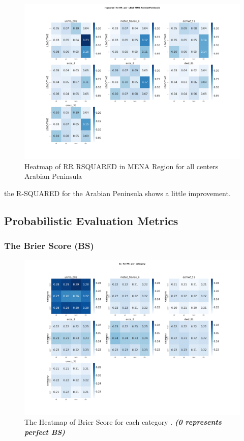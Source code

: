 \begin{figure}[H]
\includegraphics[scale=0.3]{plots/det/rsquared/rsquared_RR_ArabianPeninsula.png}
\caption{Heatmap of RR  RSQUARED in MENA Region for all centers Arabian Peninsula}
\end{figure}

the R-SQUARED for the Arabian Peninsula shows a little improvement.
\subsection{Probabilistic Evaluation Metrics}

\subsubsection{The Brier Score (BS)}

\begin{figure}[H]
    \centering
    \includegraphics[scale=0.25]{plots/prob/bs/bs_RR_category.png}
    \caption{The Heatmap of Brier Score for each category  . \textbf{\textit{(0 represents perfect BS)}}}
\end{figure}

